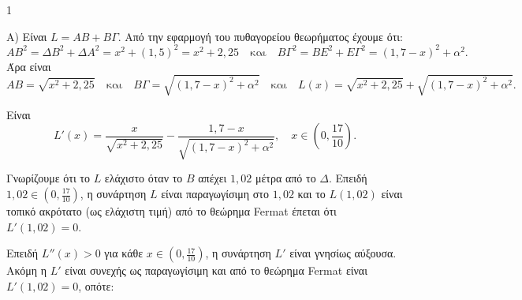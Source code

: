 \begin{ylh}{1}
    \item [Διαφορικός Λογισμός]
\end{ylh}
Α) Είναι $L = AB + B\Gamma$. Από την εφαρμογή του πυθαγορείου θεωρήματος έχουμε ότι:
\[
    AB^2 = \Delta B^2 + \Delta A^2 = x^2 + (1{,}5)^2 = x^2+2{,}25
    \quad \text{και} \quad
    B\Gamma^2 = BE^2 + E\Gamma^2 = (1{,}7-x)^2 + \alpha^2.
\]
Άρα είναι
\[
    AB = \sqrt{x^2+2{,}25} \quad \text{και} \quad B\Gamma = \sqrt{(1{,}7-x)^2+\alpha^2}
    \quad \text{και} \quad L(x)=\sqrt{x^2+2{,}25}+\sqrt{(1{,}7-x)^2+\alpha^2}.
\]
\begin{alist}
\item [β)] Είναι
\[
    L'(x)=\frac{x}{\sqrt{x^2+2{,}25}} - \frac{1{,}7-x}{\sqrt{(1{,}7-x)^2+\alpha^2}}, \quad x \in \left(0, \frac{17}{10}\right).
\]
\begin{rlist}
\item Γνωρίζουμε ότι το $L$ ελάχιστο όταν το $B$ απέχει $1{,}02$ μέτρα από το $\Delta$. Επειδή $1{,}02 \in \left(0, \frac{17}{10}\right)$, η συνάρτηση $L$ είναι παραγωγίσιμη στο $1{,}02$ και το $L(1{,}02)$ είναι τοπικό ακρότατο (ως ελάχιστη τιμή) από το θεώρημα Fermat έπεται ότι $L'(1{,}02)=0$.
\item Επειδή $L''(x)>0$ για κάθε $x \in \left(0, \frac{17}{10}\right)$, η συνάρτηση $L'$ είναι γνησίως αύξουσα.
Ακόμη η $L'$ είναι συνεχής ως παραγωγίσιμη και από το θεώρημα Fermat είναι $L'(1{,}02)=0$, οπότε:
\end{rlist}
\end{alist}